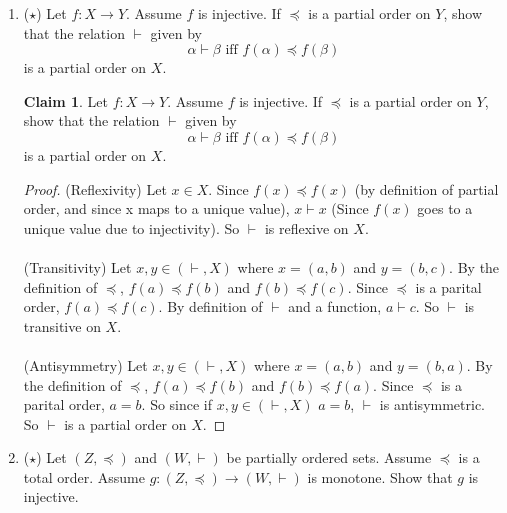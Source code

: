 \documentclass[11pt]{letter}
\theoremstyle{definition}
\newtheorem{claim}{Claim}
\begin{document}
\begin{description}
\begin{enumerate}
			\item ($\star$) Let $f:X\rightarrow Y$. Assume $f$ is injective. If $\preceq$ is a partial order on $Y$, show that the relation $\vdash$ given by
			$$\alpha\vdash \beta  \text{ iff } f(\alpha)\preceq f(\beta)$$
			  is a partial order on $X$.
                          \begin{claim}
                            Let $f:X\rightarrow Y$. Assume $f$ is injective. If $\preceq$ is a partial order on $Y$, show that the relation $\vdash$ given by
			$$\alpha\vdash \beta  \text{ iff } f(\alpha)\preceq f(\beta)$$
			  is a partial order on $X$.
                          \end{claim}
                          \begin{proof}
                            (Reflexivity)
                            Let $x\in X$. Since $f(x)\preceq f(x)$ (by definition of partial order, and since x maps to a unique value), $x\vdash x$ (Since $f(x)$ goes to a unique value due to injectivity). So $\vdash$ is reflexive on $X$.\\ \\
                            (Transitivity) Let $x,y\in (\vdash, X)$ where $x=(a,b)$ and $y=(b,c)$. By the definition of $\preceq$, $f(a)\preceq f(b)$ and $f(b)\preceq f(c)$. Since $\preceq$ is a parital order, $f(a)\preceq f(c)$. By definition of $\vdash$ and a function, $a\vdash c$. So $\vdash$ is transitive on $X$.\\ \\
                            (Antisymmetry) Let $x,y\in (\vdash, X)$ where $x=(a,b)$ and $y=(b,a)$. By the definition of $\preceq$, $f(a)\preceq f(b)$ and $f(b)\preceq f(a)$. Since $\preceq$ is a parital order, $a=b$. So since if $x,y\in (\vdash, X)$ $a=b$, $\vdash$ is antisymmetric. So $\vdash$ is a partial order on $X$.
                          \end{proof}
                          
                          
			
			\item ($\star$) Let $(Z,\preceq)$ and $(W,\vdash)$ be partially ordered sets. Assume $\preceq$ is a total order. Assume $g:(Z,\preceq)\rightarrow (W,\vdash)$ is monotone. Show that $g$ is injective.
		\end{enumerate}
		
	
	\end{description}
\end{document}

